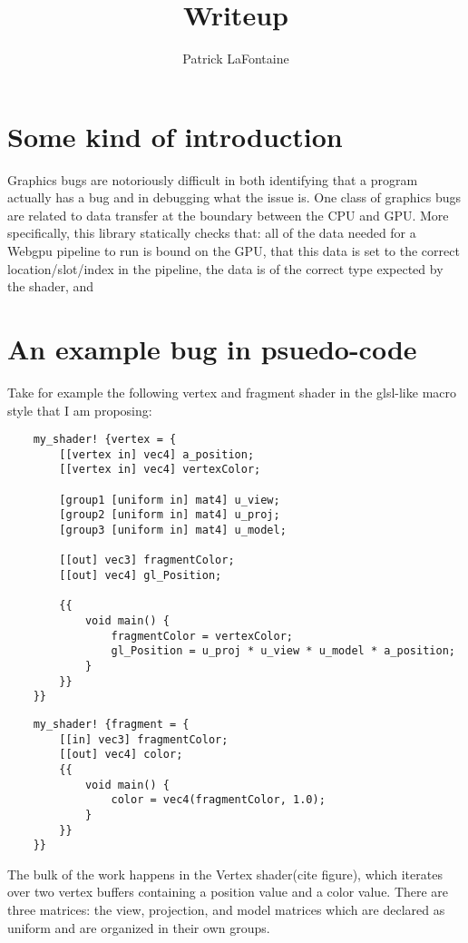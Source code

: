 \documentclass{article}
\begin{document}
\title{Writeup}
\author{Patrick LaFontaine}
\maketitle{}
\section{Some kind of introduction}

    Graphics bugs are notoriously difficult in both identifying that a program actually has a bug and in debugging what the issue is. One class of graphics bugs are related to data transfer at the boundary between the CPU and GPU. More specifically, this library statically checks that: all of the data needed for a Webgpu pipeline to run is bound on the GPU, that this data is set to the correct location/slot/index in the pipeline, the data is of the correct type expected by the shader, and

\section{An example bug in psuedo-code}

    Take for example the following vertex and fragment shader in the glsl-like macro style that I am proposing:
    \begin{lstlisting}
    my_shader! {vertex = {
        [[vertex in] vec4] a_position;
        [[vertex in] vec4] vertexColor;

        [group1 [uniform in] mat4] u_view;
        [group2 [uniform in] mat4] u_proj;
        [group3 [uniform in] mat4] u_model;

        [[out] vec3] fragmentColor;
        [[out] vec4] gl_Position;

        {{
            void main() {
                fragmentColor = vertexColor;
                gl_Position = u_proj * u_view * u_model * a_position;
            }
        }}
    }}
    \end{lstlisting}
    \begin{lstlisting}
    my_shader! {fragment = {
        [[in] vec3] fragmentColor;
        [[out] vec4] color;
        {{
            void main() {
                color = vec4(fragmentColor, 1.0);
            }
        }}
    }}
    \end{lstlisting}

    The bulk of the work happens in the Vertex shader(cite figure), which iterates over two vertex buffers containing a position value and a color value. There are three matrices: the view, projection, and model matrices which are declared as uniform and are organized in their own groups.
\end{document}
